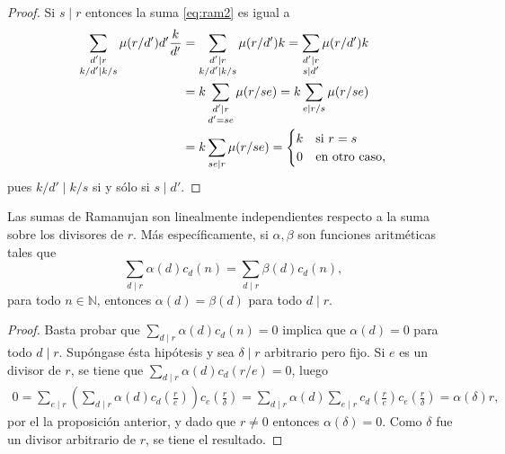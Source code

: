 \begin{proof}
Si $s \mid r$ entonces la suma \eqref{eq:ram2} es igual a
\begin{equation*}
\begin{split}
    \sum_{\substack{d' \mid r \\ k/d' \mid k/s}} \mu(r/d') d' \frac{k}{d'} &= \sum_{\substack{d' \mid r \\ k/d' \mid k/s}} \mu(r/d') k = \sum_{\substack{d' \mid r \\ s \mid d'}} \mu(r/d') k \\
    &= k \sum_{\substack{d' \mid r \\ d'=se}} \mu(r/se) = k \sum_{e \mid r/s} \mu(r/se) \\
    &= k \sum_{se \mid r} \mu(r/se) = \begin{cases}
        \hfil k & \text{si } r=s \\
        \hfil 0 & \text{en otro caso,}
    \end{cases}
\end{split}
\end{equation*}
pues $k/d' \mid k/s$ si y sólo si $s \mid d'$.
\end{proof}

\begin{corollary}\label{cor:ind}
Las sumas de Ramanujan son linealmente independientes respecto a la suma sobre los divisores de $r$. Más específicamente, si $\alpha, \beta$ son funciones aritméticas tales que
\begin{equation*}
    \sum_{d \mid r} \alpha(d) c_d(n) = \sum_{d \mid r} \beta(d) c_d(n),
\end{equation*}
para todo $n \in \mathbb{N}$, entonces $\alpha(d)=\beta(d)$ para todo $d \mid r$.
\end{corollary}
\begin{proof}
Basta probar que $\sum_{d \mid r} \alpha(d) c_d(n)=0$ implica que $\alpha(d)=0$ para todo $d \mid r$. Supóngase ésta hipótesis y sea $\delta \mid r$ arbitrario pero fijo. Si $e$ es un divisor de $r$, se tiene que $\sum_{d \mid r} \alpha(d) c_d(r/e)=0$, luego
\begin{align*}
    0 = \sum_{e \mid r} \left( \sum_{d \mid r} \alpha(d) c_d \left( \frac{r}{e} \right) \right) c_e \left( \frac{r}{\delta} \right)= \sum_{d \mid r} \alpha(d) \sum_{e \mid r} c_d \left( \frac{r}{e} \right) c_e \left( \frac{r}{\delta} \right) = \alpha(\delta) r,
\end{align*}
por el la proposición anterior, y dado que $r \ne 0$ entonces $\alpha(\delta)=0$. Como $\delta$ fue un divisor arbitrario de $r$, se tiene el resultado.
\end{proof}

